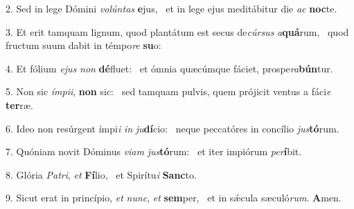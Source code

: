 2. Sed in lege Dómini \textit{vo}\textit{lún}\textit{tas} \textbf{e}jus, \ast\  et in lege ejus meditábitur die \textit{ac} \textbf{noc}te.\

3. Et erit tamquam lignum, quod plantátum est secus de\textit{cúr}\textit{sus} \textit{a}\textbf{quá}rum, \ast\  quod fructum suum dabit in témpo\textit{re} \textbf{su}o:\

4. Et fólium \textit{e}\textit{jus} \textit{non} \textbf{dé}fluet: \ast\  et ómnia quæcúmque fáciet, prospe\textit{ra}\textbf{bún}tur.\

5. Non sic \textit{ím}\textit{pi}\textit{i}, \textbf{non} sic: \ast\  sed tamquam pulvis, quem prójicit ventus a fáci\textit{e} \textbf{ter}ræ.\

6. Ideo non resúrgent ímpi\textit{i} \textit{in} \textit{ju}\textbf{dí}cio: \ast\  neque peccatóres in concílio \textit{jus}\textbf{tó}rum.\

7. Quóniam novit Dóminus \textit{vi}\textit{am} \textit{jus}\textbf{tó}rum: \ast\  et iter impiórum \textit{per}\textbf{í}bit.\

8. Glória \textit{Pa}\textit{tri}, \textit{et} \textbf{Fí}lio, \ast\  et Spirítu\textit{i} \textbf{Sanc}to.\

9. Sicut erat in princípio, \textit{et} \textit{nunc}, \textit{et} \textbf{sem}per, \ast\  et in sǽcula sæculó\textit{rum}. \textbf{A}men.\

